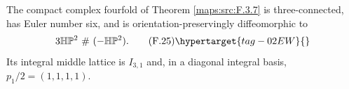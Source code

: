 \begin{theorem}\hypertarget{tag-02OC}{}\label{maps:src:F.4.1}


The compact complex fourfold of Theorem \ref{maps:src:F.3.7} is three-connected,
has Euler number six, and is orientation-preservingly diffeomorphic to
\[
 3\mathbb H\mathbb P^2\ \#\ (-\mathbb H\mathbb P^2).
 \tag{F.25}\hypertarget{tag-02EW}{}\label{maps:eq:F.25}
\]
Its integral middle lattice is $I_{3,1}$ and, in a diagonal integral
basis, $p_1/2=(1,1,1,1)$.  

\end{theorem}


